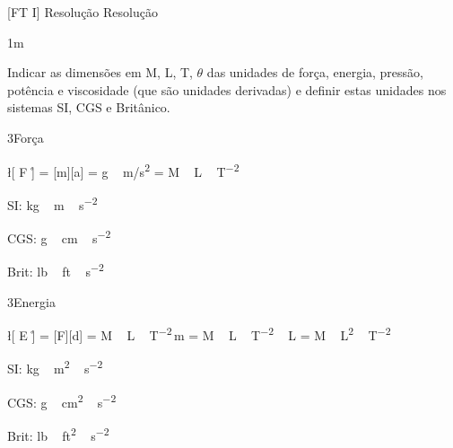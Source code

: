 \documentclass[\mainfilename]{subfiles}
\begin{document}
[FT I]
{Resolução}
{Resolução}

\begin{questionBox}1m{} %
    
    Indicar as dimensões em M, L, T, \(\theta\) das unidades de força, energia, pressão, potência e viscosidade (que são unidades derivadas) e definir estas unidades nos sistemas SI, CGS e Britânico.

    \begin{questionBox}3{Força} %
        
        \begin{BM}
            \l[ F \r]
            = [m][a]
            = \si{\gram\,\metre/\second^2}
            = \si{M\,L\,T^{-2}}
        \end{BM}

        \begin{itemize}
            \begin{multicols}{3}
                \item[SI:]   \si{\kilo\gram\,\metre\,\second^{-2}}
                \item[CGS:]  \si{\gram\,\centi\metre\,\second^{-2}}
                \item[Brit:] \si{lb\,ft\,\second^{-2}}
            \end{multicols}
        \end{itemize}
        
    \end{questionBox}

    \begin{questionBox}3{Energia} %
        
        \begin{BM}
            \l[ E \r]
            = [F][d]
            = \si{M\,L\,T^{-2}}\,\si{\metre}
            = \si{M\,L\,T^{-2}\,L}
            = \si{M\,L^2\,T^{-2}}
        \end{BM}

        \begin{itemize}
            \begin{multicols}{3}
                \item[SI:]   \si{\kilo\gram\,\metre^2\,\second^{-2}}
                \item[CGS:]  \si{\gram\,\centi\metre^2\,\second^{-2}}
                \item[Brit:] \si{lb\,ft^2\,\second^{-2}}
            \end{multicols}
        \end{itemize}
        

\end{questionBox}
\end{questionBox}
\end{document}
